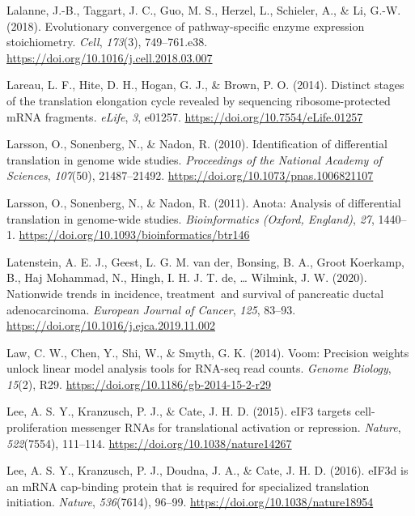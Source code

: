 \documentclass[12pt,openany]{book}
\begin{document}
\hypertarget{ref-Lalanne2018}{}
Lalanne, J.-B., Taggart, J. C., Guo, M. S., Herzel, L., Schieler, A., \&
Li, G.-W. (2018). Evolutionary convergence of pathway-specific enzyme
expression stoichiometry. \emph{Cell}, \emph{173}(3), 749--761.e38.
\url{https://doi.org/10.1016/j.cell.2018.03.007}

\hypertarget{ref-Lareau2014}{}
Lareau, L. F., Hite, D. H., Hogan, G. J., \& Brown, P. O. (2014).
Distinct stages of the translation elongation cycle revealed by
sequencing ribosome-protected mRNA fragments. \emph{eLife}, \emph{3},
e01257. \url{https://doi.org/10.7554/eLife.01257}

\hypertarget{ref-Larsson2010}{}
Larsson, O., Sonenberg, N., \& Nadon, R. (2010). Identification of
differential translation in genome wide studies. \emph{Proceedings of
the National Academy of Sciences}, \emph{107}(50), 21487--21492.
\url{https://doi.org/10.1073/pnas.1006821107}

\hypertarget{ref-Larsson2011}{}
Larsson, O., Sonenberg, N., \& Nadon, R. (2011). Anota: Analysis of
differential translation in genome-wide studies. \emph{Bioinformatics
(Oxford, England)}, \emph{27}, 1440--1.
\url{https://doi.org/10.1093/bioinformatics/btr146}

\hypertarget{ref-Latenstein2020}{}
Latenstein, A. E. J., Geest, L. G. M. van der, Bonsing, B. A., Groot
Koerkamp, B., Haj Mohammad, N., Hingh, I. H. J. T. de, \ldots{} Wilmink,
J. W. (2020). Nationwide trends in incidence, treatment~and survival of
pancreatic ductal adenocarcinoma. \emph{European Journal of Cancer},
\emph{125}, 83--93. \url{https://doi.org/10.1016/j.ejca.2019.11.002}

\hypertarget{ref-Law2014}{}
Law, C. W., Chen, Y., Shi, W., \& Smyth, G. K. (2014). Voom: Precision
weights unlock linear model analysis tools for RNA-seq read counts.
\emph{Genome Biology}, \emph{15}(2), R29.
\url{https://doi.org/10.1186/gb-2014-15-2-r29}

\hypertarget{ref-Lee2015}{}
Lee, A. S. Y., Kranzusch, P. J., \& Cate, J. H. D. (2015). eIF3 targets
cell-proliferation messenger RNAs for translational activation or
repression. \emph{Nature}, \emph{522}(7554), 111--114.
\url{https://doi.org/10.1038/nature14267}

\hypertarget{ref-Lee2016}{}
Lee, A. S. Y., Kranzusch, P. J., Doudna, J. A., \& Cate, J. H. D.
(2016). eIF3d is an mRNA cap-binding protein that is required for
specialized translation initiation. \emph{Nature}, \emph{536}(7614),
96--99. \url{https://doi.org/10.1038/nature18954}
\end{document}
